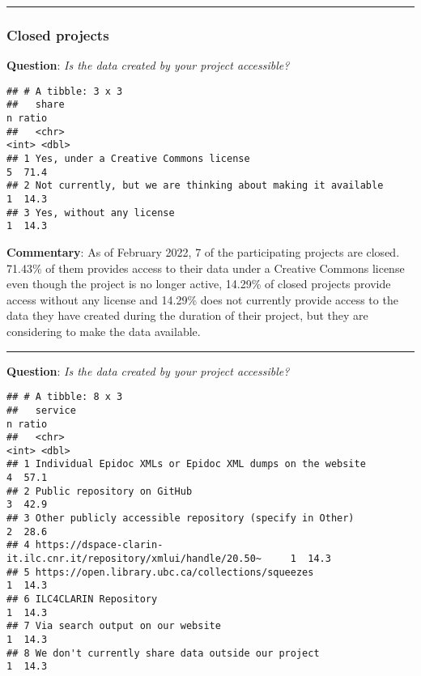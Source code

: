 \documentclass[
]{article}
\begin{document}
\begin{center}\rule{0.5\linewidth}{0.5pt}\end{center}

\hypertarget{closed-projects}{%
\subsubsection{Closed projects}\label{closed-projects}}

\textbf{Question}: \emph{Is the data created by your project
accessible?}

\begin{verbatim}
## # A tibble: 3 x 3
##   share                                                            n ratio
##   <chr>                                                        <int> <dbl>
## 1 Yes, under a Creative Commons license                            5  71.4
## 2 Not currently, but we are thinking about making it available     1  14.3
## 3 Yes, without any license                                         1  14.3
\end{verbatim}

\textbf{Commentary}: As of February 2022, 7 of the participating
projects are closed. 71.43\% of them provides access to their data under
a Creative Commons license even though the project is no longer active,
14.29\% of closed projects provide access without any license and
14.29\% does not currently provide access to the data they have created
during the duration of their project, but they are considering to make
the data available.

\begin{center}\rule{0.5\linewidth}{0.5pt}\end{center}

\textbf{Question}: \emph{Is the data created by your project
accessible?}

\begin{verbatim}
## # A tibble: 8 x 3
##   service                                                                n ratio
##   <chr>                                                              <int> <dbl>
## 1 Individual Epidoc XMLs or Epidoc XML dumps on the website              4  57.1
## 2 Public repository on GitHub                                            3  42.9
## 3 Other publicly accessible repository (specify in Other)                2  28.6
## 4 https://dspace-clarin-it.ilc.cnr.it/repository/xmlui/handle/20.50~     1  14.3
## 5 https://open.library.ubc.ca/collections/squeezes                       1  14.3
## 6 ILC4CLARIN Repository                                                  1  14.3
## 7 Via search output on our website                                       1  14.3
## 8 We don't currently share data outside our project                      1  14.3
\end{verbatim}
\end{document}
